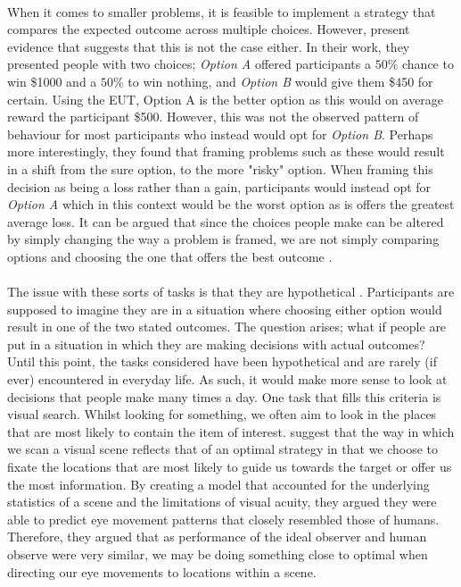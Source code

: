 \documentclass[12pt]{article}
\begin{document}
\paragraph{} When it comes to smaller problems, it is feasible to implement a strategy that compares the expected outcome across multiple choices. However, \cite{KahnemanProspect} present evidence that suggests that this is not the case either. In their work, they presented people with two choices; \textit{Option A} offered participants a $50\%$ chance to win \$1000 and a $50\%$ to win nothing, and \textit{Option B} would give them \$450 for certain. Using the EUT, Option A is the better option as this would on average reward the participant \$500. However, this was not the observed pattern of behaviour for most participants who instead would opt for \textit{Option B}. Perhaps more interestingly, they found that framing problems such as these would result in a shift from the sure option, to the more "risky" option. When framing this decision as being a loss rather than a gain, participants would instead opt for \textit{Option A} which in this context would be the worst option as is offers the greatest average loss. It can be argued that since the choices people make can be altered by simply changing the way a problem is framed, we are not simply comparing options and choosing the one that offers the best outcome \citep{KahnemanChoicesValuseFrames}.

\paragraph{} The issue with these sorts of tasks is that they are hypothetical \citep{KahnemanProspect}. Participants are supposed to imagine they are in a situation where choosing either option would result in one of the two stated outcomes. The question arises; what if people are put in a situation in which they are making decisions with actual outcomes? Until this point, the tasks considered have been hypothetical and are rarely (if ever) encountered in everyday life. As such, it would make more sense to look at decisions that people make many times a day. One task that fills this criteria is visual search. Whilst looking for something, we often aim to look in the places that are most likely to contain the item of interest. \cite{najemnik2005optimal} suggest that the way in which we scan a visual scene reflects that of an optimal strategy in that we choose to fixate the locations that are most likely to guide us towards the target or offer us the most information. By creating a model that accounted for the underlying statistics of a scene and the limitations of visual acuity, they argued they were able to predict eye movement patterns that closely resembled those of humans. Therefore, they argued that as performance of the ideal observer and human observe were very similar, we may be doing something close to optimal when directing our eye movements to locations within a scene.
\end{document}
